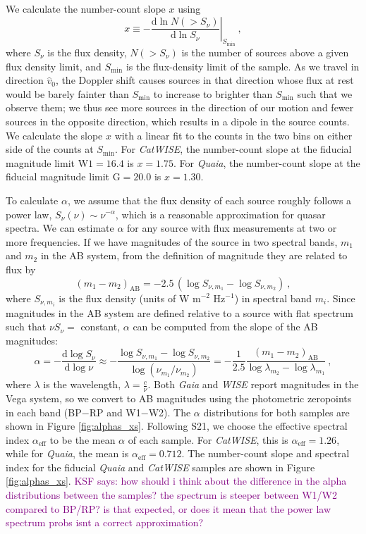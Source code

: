 \documentclass[modern]{aastex631}
\newcommand{\ksf}[1]{\textcolor{purple}{KSF says: #1}}
\newcommand{\catwise}{\textsl{CatWISE}\xspace}
\newcommand{\quaia}{\textsl{Quaia}\xspace}
\newcommand{\gaia}{\textsl{Gaia}\xspace}
\newcommand{\wise}{\textsl{WISE}\xspace}
\newcommand{\dd}{\mathrm{d}}
\newcommand{\w}{\mathrm{W}}
\newcommand{\g}{\mathrm{G}}
\begin{document}
We calculate the number-count slope $x$ using
\begin{equation}
    x \equiv -\left.\frac{\dd\ln N(>S_\nu)}{\dd\ln S_\nu}\right|_{S_\mathrm{min}} ~,
\end{equation}
where $S_\nu$ is the flux density, $N(>S_\nu)$ is the number of sources above a given flux density limit, and $S_\mathrm{min}$ is the flux-density limit of the sample.
As we travel in direction $\hat v_0$, the Doppler shift causes sources in that direction whose flux at rest would be barely fainter than $S_\mathrm{min}$ to increase to brighter than $S_\mathrm{min}$ such that we observe them; we thus see more sources in the direction of our motion and fewer sources in the opposite direction, which results in a dipole in the source counts.
We calculate the slope $x$ with a linear fit to the counts in the two bins on either side of the counts at $S_\mathrm{min}$.
For \catwise, the number-count slope at the fiducial magnitude limit $\w 1=16.4$ is $x=1.75$.
For \quaia, the number-count slope at the fiducial magnitude limit $\g =20.0$ is $x=1.30$. 

To calculate $\alpha$, we assume that the flux density of each source roughly follows a power law, $S_\nu(\nu)\sim\nu^{-\alpha}$, which is a reasonable approximation for quasar spectra.
We can estimate $\alpha$ for any source with flux measurements at two or more frequencies.
If we have magnitudes of the source in two spectral bands, $m_1$ and $m_2$ in the AB system, from the definition of magnitude they are related to flux by
\begin{equation}
    (m_1-m_2)_\mathrm{AB}=-2.5\,(\log S_{\nu,m_1}-\log S_{\nu,m_2}) ~,
\end{equation}
where $S_{\nu,m_i}$ is the flux density (units of W m$^{-2}$ Hz$^{-1}$) in spectral band $m_i$.
Since magnitudes in the AB system are defined relative to a source with flat spectrum such that $\nu S_\nu=$ constant, $\alpha$ can be computed from the slope of the AB magnitudes:
\begin{equation}
    \alpha = -\frac{\dd\log S_\nu}{\dd\log\nu} \approx -\frac{\log S_{\nu,m_1}-\log S_{\nu,m_2}}{\log\left(\nu_{m_1}/\nu_{m_2}\right)} = -\frac{1}{2.5}\frac{(m_1-m_2)_{\mathrm{AB}}}{\log\lambda_{m_2} -\log\lambda_{m_1}} ~,
\end{equation}
where $\lambda$ is the wavelength, $\lambda=\frac{c}{\nu}$.
Both \gaia and \wise report magnitudes in the Vega system, so we convert to AB magnitudes using the photometric zeropoints in each band (BP$-$RP and W1$-$W2).
The $\alpha$ distributions for both samples are shown in Figure \ref{fig:alphas_xs}.
Following S21, we choose the effective spectral index $\alpha_\mathrm{eff}$ to be the mean $\alpha$ of each sample.
For \catwise, this is $\alpha_\mathrm{eff}=1.26$, while for \quaia, the mean is $\alpha_\mathrm{eff}=0.712$.
The number-count slope and spectral index for the fiducial \quaia and \catwise samples are shown in Figure \ref{fig:alphas_xs}.
\ksf{how should i think about the difference in the alpha distributions between the samples? the spectrum is steeper between W1/W2 compared to BP/RP? is that expected, or does it mean that the power law spectrum probs isnt a correct approximation?}
\end{document}
